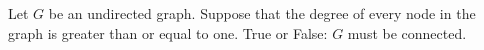 \begin{prob}
    Let $G$ be an undirected graph. Suppose that the degree of every node in the graph
    is greater than or equal to one. True or False: $G$ must be connected.

    \tF{}

\end{prob}
